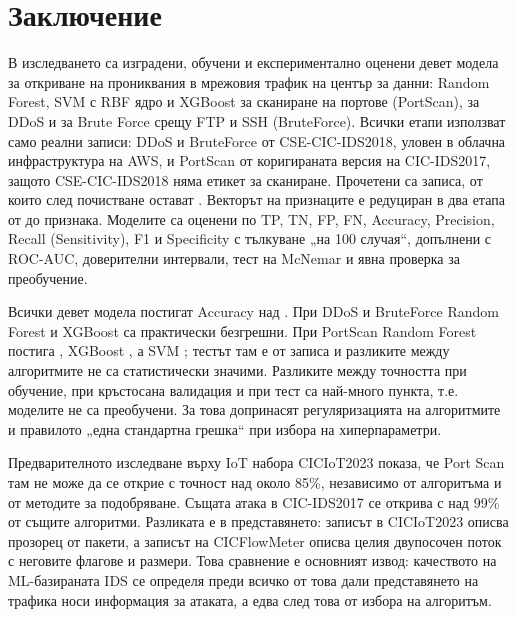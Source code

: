 \chapter*{Заключение}

В изследването са изградени, обучени и експериментално оценени девет модела за откриване на прониквания в мрежовия трафик на център за данни: Random Forest, SVM с RBF ядро и XGBoost за сканиране на портове (PortScan), за DDoS и за Brute Force срещу FTP и SSH (BruteForce). Всички етапи използват само реални записи: DDoS и BruteForce от CSE-CIC-IDS2018, уловен в облачна инфраструктура на AWS, и PortScan от коригираната версия на CIC-IDS2017, защото CSE-CIC-IDS2018 няма етикет за сканиране. Прочетени са  записа, от които след почистване остават . Векторът на признаците е редуциран в два етапа от  до  признака. Моделите са оценени по TP, TN, FP, FN, Accuracy, Precision, Recall (Sensitivity), F1 и Specificity с тълкуване „на 100 случая“, допълнени с ROC-AUC, доверителни интервали, тест на McNemar и явна проверка за преобучение.

Всички девет модела постигат Accuracy над . При DDoS и BruteForce Random Forest и XGBoost са практически безгрешни. При PortScan Random Forest постига , XGBoost , а SVM ; тестът там е от  записа и разликите между алгоритмите не са статистически значими. Разликите между точността при обучение, при кръстосана валидация и при тест са най-много  пункта, т.е. моделите не са преобучени. За това допринасят регуляризацията на алгоритмите и правилото „една стандартна грешка“ при избора на хиперпараметри.

Предварителното изследване върху IoT набора CICIoT2023 показа, че Port Scan там не може да се открие с точност над около 85\%, независимо от алгоритъма и от методите за подобряване. Същата атака в CIC-IDS2017 се открива с над 99\% от същите алгоритми. Разликата е в представянето: записът в CICIoT2023 описва прозорец от пакети, а записът на CICFlowMeter описва целия двупосочен поток с неговите флагове и размери. Това сравнение е основният извод: качеството на ML-базираната IDS се определя преди всичко от това дали представянето на трафика носи информация за атаката, а едва след това от избора на алгоритъм.

